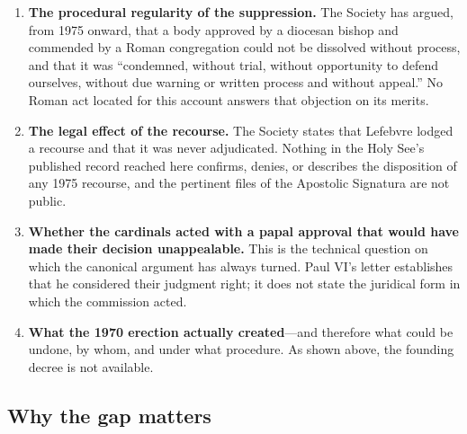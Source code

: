 \begin{enumerate}
\item \textbf{The procedural regularity of the suppression.} The Society
has argued, from 1975 onward, that a body approved by a diocesan bishop
and commended by a Roman congregation could not be dissolved without
process, and that it was ``condemned, without trial, without opportunity
to defend ourselves, without due warning or written process and without
appeal.'' No Roman act
located for this account answers that objection on its merits.
\item \textbf{The legal effect of the recourse.} The Society states that
Lefebvre lodged a recourse and that it was never adjudicated. Nothing in
the Holy See's published record reached here confirms, denies, or
describes the disposition of any 1975 recourse, and the pertinent files of
the Apostolic Signatura are not public.
\item \textbf{Whether the cardinals acted with a papal approval that
would have made their decision unappealable.} This is the technical
question on which the canonical argument has always turned. Paul VI's
letter establishes that he considered their judgment right; it does not
state the juridical form in which the commission acted.
\item \textbf{What the 1970 erection actually created}---and therefore
what could be undone, by whom, and under what procedure. As shown above,
the founding decree is not available.
\end{enumerate}


\subsection{Why the gap matters}

